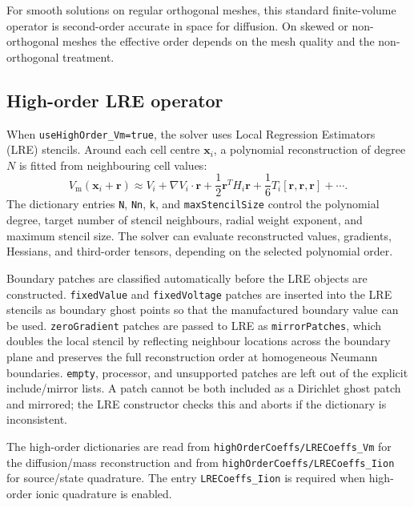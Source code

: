 \documentclass[11pt,a4paper]{article}
\newcommand{\code}[1]{\texttt{\small #1}}
\newcommand{\Vm}{V_{\text{m}}}
\newcommand{\grad}{\nabla}
\begin{document}
For smooth solutions on regular orthogonal meshes, this standard finite-volume
operator is second-order accurate in space for diffusion. On skewed or
non-orthogonal meshes the effective order depends on the mesh quality and the
non-orthogonal treatment.

\subsection{High-order LRE operator}
\label{sec:lre}

When \code{useHighOrder\_Vm=true}, the solver uses Local
Regression Estimators (LRE) stencils. Around each cell centre $\mathbf{x}_i$, a polynomial
reconstruction of degree $N$ is fitted from neighbouring cell values:
\begin{equation}
  \Vm(\mathbf{x}_i+\mathbf{r})
  \approx
  V_i
  + \grad V_i\cdot\mathbf{r}
  + \frac{1}{2}\mathbf{r}^{T}H_i\mathbf{r}
  + \frac{1}{6}T_i[\mathbf{r},\mathbf{r},\mathbf{r}]
  + \cdots.
  \label{eq:lre-taylor}
\end{equation}
The dictionary entries \code{N}, \code{Nn}, \code{k}, and
\code{maxStencilSize} control the polynomial degree, target number of stencil
neighbours, radial weight exponent, and maximum stencil size. The solver can
evaluate reconstructed values, gradients, Hessians, and third-order tensors,
depending on the selected polynomial order.

Boundary patches are classified automatically before the LRE objects are
constructed. \code{fixedValue} and \code{fixedVoltage} patches are inserted into
the LRE stencils as boundary ghost points so that the manufactured boundary
value can be used. \code{zeroGradient} patches are passed to LRE as
\code{mirrorPatches}, which doubles the local stencil by reflecting neighbour
locations across the boundary plane and preserves the full reconstruction order
at homogeneous Neumann boundaries. \code{empty}, processor, and unsupported
patches are left out of the explicit include/mirror lists. A patch cannot be
both included as a Dirichlet ghost patch and mirrored; the LRE constructor
checks this and aborts if the dictionary is inconsistent.

The high-order dictionaries are read from
\code{highOrderCoeffs/LRECoeffs\_Vm} for the diffusion/mass reconstruction and
from \code{highOrderCoeffs/LRECoeffs\_Iion} for source/state quadrature. The
entry \code{LRECoeffs\_Iion} is required when high-order ionic quadrature is
enabled.
\end{document}
